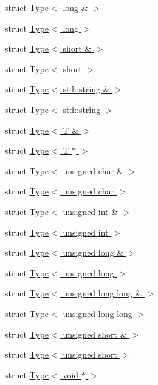 \begin{DoxyCompactItemize}
struct \hyperlink{structSLB_1_1Private_1_1Type_3_01long_01_6_01_4}{Type$<$ long \& $>$}
\item 
struct \hyperlink{structSLB_1_1Private_1_1Type_3_01long_01_4}{Type$<$ long $>$}
\item 
struct \hyperlink{structSLB_1_1Private_1_1Type_3_01short_01_6_01_4}{Type$<$ short \& $>$}
\item 
struct \hyperlink{structSLB_1_1Private_1_1Type_3_01short_01_4}{Type$<$ short $>$}
\item 
struct \hyperlink{structSLB_1_1Private_1_1Type_3_01std_1_1string_01_6_01_4}{Type$<$ std\+::string \& $>$}
\item 
struct \hyperlink{structSLB_1_1Private_1_1Type_3_01std_1_1string_01_4}{Type$<$ std\+::string $>$}
\item 
struct \hyperlink{structSLB_1_1Private_1_1Type_3_01T_01_6_01_4}{Type$<$ T \& $>$}
\item 
struct \hyperlink{structSLB_1_1Private_1_1Type_3_01T_01_5_01_4}{Type$<$ T $\ast$ $>$}
\item 
struct \hyperlink{structSLB_1_1Private_1_1Type_3_01unsigned_01char_01_6_01_4}{Type$<$ unsigned char \& $>$}
\item 
struct \hyperlink{structSLB_1_1Private_1_1Type_3_01unsigned_01char_01_4}{Type$<$ unsigned char $>$}
\item 
struct \hyperlink{structSLB_1_1Private_1_1Type_3_01unsigned_01int_01_6_01_4}{Type$<$ unsigned int \& $>$}
\item 
struct \hyperlink{structSLB_1_1Private_1_1Type_3_01unsigned_01int_01_4}{Type$<$ unsigned int $>$}
\item 
struct \hyperlink{structSLB_1_1Private_1_1Type_3_01unsigned_01long_01_6_01_4}{Type$<$ unsigned long \& $>$}
\item 
struct \hyperlink{structSLB_1_1Private_1_1Type_3_01unsigned_01long_01_4}{Type$<$ unsigned long $>$}
\item 
struct \hyperlink{structSLB_1_1Private_1_1Type_3_01unsigned_01long_01long_01_6_01_4}{Type$<$ unsigned long long \& $>$}
\item 
struct \hyperlink{structSLB_1_1Private_1_1Type_3_01unsigned_01long_01long_01_4}{Type$<$ unsigned long long $>$}
\item 
struct \hyperlink{structSLB_1_1Private_1_1Type_3_01unsigned_01short_01_6_01_4}{Type$<$ unsigned short \& $>$}
\item 
struct \hyperlink{structSLB_1_1Private_1_1Type_3_01unsigned_01short_01_4}{Type$<$ unsigned short $>$}
\item 
struct \hyperlink{structSLB_1_1Private_1_1Type_3_01void_01_5_01_4}{Type$<$ void $\ast$ $>$}
\end{DoxyCompactItemize}
